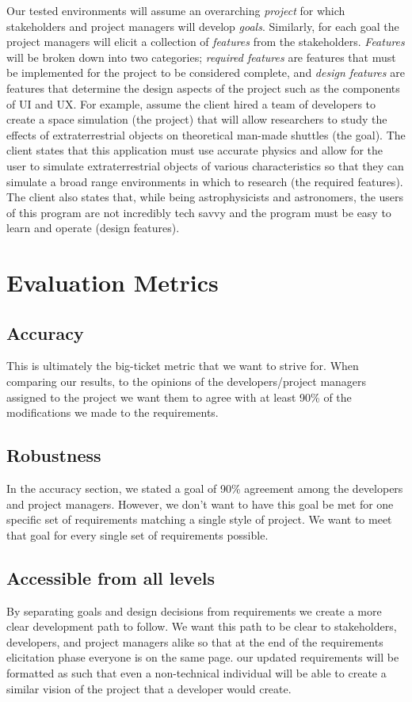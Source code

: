 \documentclass[format=acmlarge]{acmart}
\begin{document}
Our tested environments will assume an overarching \emph{project} for which stakeholders and project managers will develop \emph{goals}. Similarly, for each goal the project managers will elicit a collection of \emph{features} from the stakeholders. \emph{Features} will be broken down into two categories; \emph{required features} are features that must be implemented for the project to be considered complete, and \emph{design features} are features that determine the design aspects of the project such as the components of UI and UX. For example, assume the client hired a team of developers to create a space simulation (the project) that will allow researchers to study the effects of extraterrestrial objects on theoretical man-made shuttles (the goal). The client states that this application must use accurate physics and allow for the user to simulate extraterrestrial objects of various characteristics so that they can simulate a broad range environments in which to research (the required features). The client also states that, while being astrophysicists and astronomers, the users of this program are not incredibly tech savvy and the program must be easy to learn and operate (design features).

\section{Evaluation Metrics}
\subsection{Accuracy}
This is ultimately the big-ticket metric that we want to strive for. When comparing our results, to the opinions of the developers/project managers assigned to the project we want them to agree with at least 90\% of the modifications we made to the requirements.

\subsection{Robustness}
In the accuracy section, we stated a goal of 90\% agreement among the developers and project managers. However, we don't want to have this goal be met for one specific set of requirements matching a single style of project. We want to meet that goal for every single set of requirements possible.

\subsection{Accessible from all levels}
By separating goals and design decisions from requirements we create a more clear development path to follow. We want this path to be clear to stakeholders, developers, and project managers alike so that at the end of the requirements elicitation phase everyone is on the same page. our updated requirements will be formatted as such that even a non-technical individual will be able to create a similar vision of the project that a developer would create.
\end{document}
